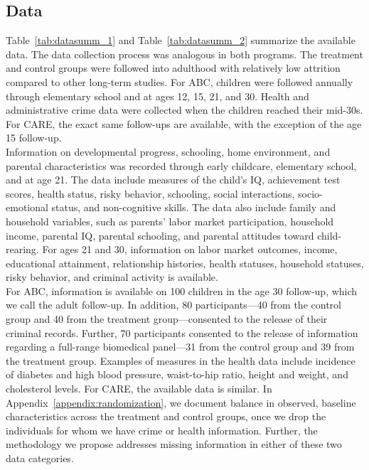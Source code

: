 \subsection{Data} \label{section:data}



\noindent Table~\ref{tab:datasumm_1} and Table~\ref{tab:datasumm_2} summarize the available data. The data collection process was analogous in both programs. The treatment and control groups were followed into adulthood with relatively low attrition compared to other long-term studies. For ABC, children were followed annually through elementary school and at ages 12, 15, 21, and 30. Health and administrative crime data were collected when the children reached their mid-30s. For CARE, the exact same follow-ups are available, with the exception of the age 15 follow-up.\\

\noindent Information on developmental progress, schooling, home environment, and parental characteristics was recorded through early childcare, elementary school, and at age 21. The data include measures of the child's IQ, achievement test scores, health status, risky behavior, schooling, social interactions, socio-emotional status, and non-cognitive skills. The data also include family and household variables, such as parents' labor market participation, household income, parental IQ, parental schooling, and parental attitudes toward child-rearing. For ages 21 and 30, information on labor market outcomes, income, educational attainment, relationship histories, health statuses, household statuses, risky behavior, and criminal activity is available.\\

\noindent For ABC, information is available on 100 children in the age 30 follow-up, which we call the adult follow-up. In addition, 80 participants---40 from the control group and 40 from the treatment group---consented to the release of their criminal records. Further, 70 participants consented to the release of information regarding a full-range biomedical panel---31 from the control group and 39 from the treatment group. Examples of measures in the health data include incidence of diabetes and high blood pressure, waist-to-hip ratio, height and weight, and cholesterol levels. For CARE, the available data is similar. In Appendix~\ref{appendix:randomization}, we document balance in observed, baseline characteristics across the treatment and control groups, once we drop the individuals for whom we have crime or health information. Further, the methodology we propose addresses missing information in either of these two data categories.

